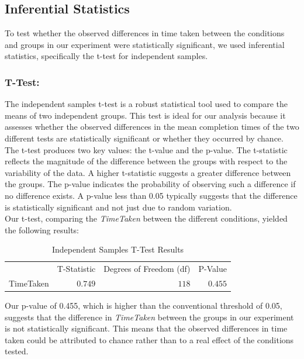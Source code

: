\documentclass{article}
\begin{document}
\subsection{Inferential Statistics}

To test whether the observed differences in time taken between the conditions and groups in our experiment were statistically significant, we used inferential statistics, specifically the t-test for independent samples.


\subsubsection*{T-Test:}
The independent samples t-test is a robust statistical tool used to compare the means of two independent groups. This test is ideal for our analysis because it assesses whether the observed differences in the mean completion times of the two different tests are statistically significant or whether they occurred by chance.\\

The t-test produces two key values: the t-value and the p-value. The t-statistic reflects the magnitude of the difference between the groups with respect to the variability of the data. A higher t-statistic suggests a greater difference between the groups. The p-value indicates the probability of observing such a difference if no difference exists. A p-value less than 0.05 typically suggests that the difference is statistically significant and not just due to random variation.\\

Our t-test, comparing the \textit{TimeTaken} between the different conditions, yielded the following results:
\begin{table}[h]
	\centering
	\caption{Independent Samples T-Test Results}
	\label{tab:independentSamplesTTest}
	{
		\begin{tabular}{lrrr}
			\toprule
			 & T-Statistic & Degrees of Freedom (df) & P-Value  \\
			\cmidrule[0.4pt]{1-4}
			TimeTaken & $0.749$ & $118$ & $0.455$  \\
			\bottomrule
		\end{tabular}
	}
\end{table}

Our p-value of 0.455, which is higher than the conventional threshold of 0.05, suggests that the difference in \textit{TimeTaken} between the groups in our experiment is not statistically significant. This means that the observed differences in time taken could be attributed to chance rather than to a real effect of the conditions tested.
\end{document}
